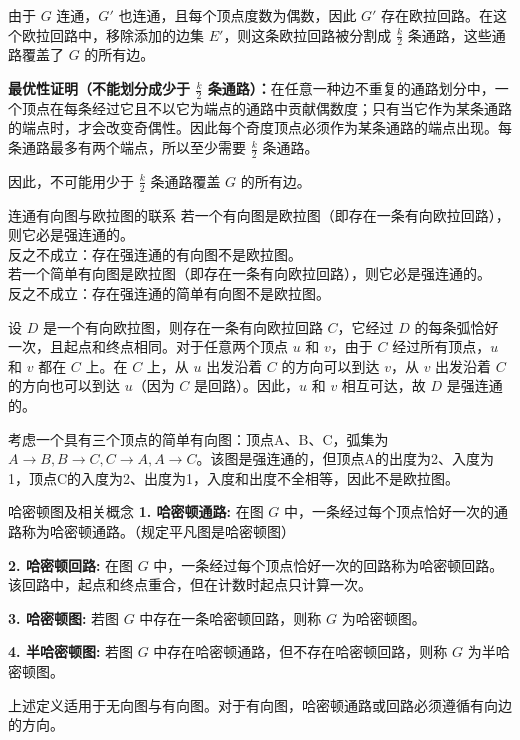 \documentclass[lang=cn,11pt]{elegantbook}
\begin{document}
由于 $G$ 连通，$G'$ 也连通，且每个顶点度数为偶数，因此 $G'$ 存在欧拉回路。在这个欧拉回路中，移除添加的边集 $E'$，则这条欧拉回路被分割成 $\frac{k}{2}$ 条通路，这些通路覆盖了 $G$ 的所有边。
    
\textbf{最优性证明（不能划分成少于 $\frac{k}{2}$ 条通路）：}在任意一种边不重复的通路划分中，一个顶点在每条经过它且不以它为端点的通路中贡献偶数度；只有当它作为某条通路的端点时，才会改变奇偶性。因此每个奇度顶点必须作为某条通路的端点出现。每条通路最多有两个端点，所以至少需要 $\frac{k}{2}$ 条通路。
    
因此，不可能用少于 $\frac{k}{2}$ 条通路覆盖 $G$ 的所有边。
\begin{theorem}{连通有向图与欧拉图的联系}
若一个有向图是欧拉图（即存在一条有向欧拉回路），则它必是强连通的。\\
反之不成立：存在强连通的有向图不是欧拉图。\\
若一个简单有向图是欧拉图（即存在一条有向欧拉回路），则它必是强连通的。\\
反之不成立：存在强连通的简单有向图不是欧拉图。
\end{theorem}
设 $D$ 是一个有向欧拉图，则存在一条有向欧拉回路 $C$，它经过 $D$ 的每条弧恰好一次，且起点和终点相同。对于任意两个顶点 $u$ 和 $v$，由于 $C$ 经过所有顶点，$u$ 和 $v$ 都在 $C$ 上。在 $C$ 上，从 $u$ 出发沿着 $C$ 的方向可以到达 $v$，从 $v$ 出发沿着 $C$ 的方向也可以到达 $u$（因为 $C$ 是回路）。因此，$u$ 和 $v$ 相互可达，故 $D$ 是强连通的。

考虑一个具有三个顶点的简单有向图：顶点A、B、C，弧集为$A\to B,B\to C,C\to A,A\to C$。该图是强连通的，但顶点A的出度为2、入度为1，顶点C的入度为2、出度为1，入度和出度不全相等，因此不是欧拉图。
\begin{definition}{哈密顿图及相关概念}
    \textbf{1. 哈密顿通路:}
    在图 $G$ 中，一条经过每个顶点恰好一次的通路称为哈密顿通路。（规定平凡图是哈密顿图）

    \textbf{2. 哈密顿回路:}
    在图 $G$ 中，一条经过每个顶点恰好一次的回路称为哈密顿回路。该回路中，起点和终点重合，但在计数时起点只计算一次。

    \textbf{3. 哈密顿图:}
    若图 $G$ 中存在一条哈密顿回路，则称 $G$ 为哈密顿图。

    \textbf{4. 半哈密顿图:}
    若图 $G$ 中存在哈密顿通路，但不存在哈密顿回路，则称 $G$ 为半哈密顿图。
\end{definition}
上述定义适用于无向图与有向图。对于有向图，哈密顿通路或回路必须遵循有向边的方向。
\end{document}
